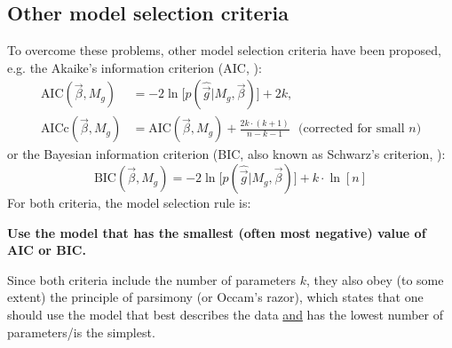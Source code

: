\documentclass[a4paper,notitlepage]{article}
\begin{document}
\subsection{Other model selection criteria}
To overcome these problems, other model selection criteria \cite{BURNHA2002} have been proposed, e.g. the Akaike's information criterion (AIC, \cite{AKAIKE1974,BURNHA2002}):
\begin{align}
  \mbox{AIC}(\vec{\beta},M_g)&=-2\ln\bigl[p(\hat{\vec{g}}|M_g,\vec{\beta})\bigr]+2k, \label{eq:aic}\\
  \mbox{AICc}(\vec{\beta},M_g)&=\mbox{AIC}(\vec{\beta},M_g)+\frac{2k\cdot(k+1)}{n-k-1}\ \ \ \text{(corrected for small $n$)} \label{eq:aicc}
\end{align}
or the Bayesian information criterion (BIC, also known as Schwarz's criterion, \cite{SCHWAR1978,BURNHA2002}):
\begin{equation}\label{eq:bic}
  \mbox{BIC}(\vec{\beta},M_g)=-2\ln\bigl[p(\hat{\vec{g}}|M_g,\vec{\beta})\bigr]+k\cdot\ln [n]
\end{equation}
For both criteria, the model selection rule is:
\begin{center}
  \bfseries Use the model that has the smallest (often most negative) value of AIC or BIC.
\end{center}
Since both criteria include the number of parameters $k$, they also obey (to some extent) the principle of parsimony (or Occam's razor), which states that one should use the model that best describes the data \underline{and} has the lowest number of parameters/is the simplest.
\end{document}
